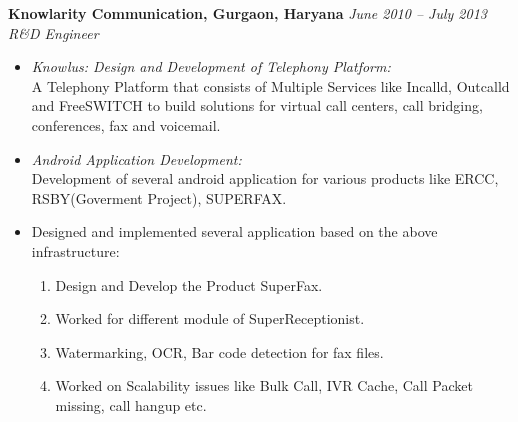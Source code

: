 \documentclass[margin,line]{resume}
\begin{document}
\begin{resume}
    \textbf{Knowlarity Communication, Gurgaon, Haryana}   \hfill \textsl{June 2010 -- July 2013} \vspace{0mm}\\\vspace{0mm}%
           \textsl{R\&D Engineer} 
    \begin{itemize}
     \item \textsl{Knowlus: Design and Development of Telephony Platform:} \\
       A Telephony Platform that consists of Multiple Services like Incalld, Outcalld and FreeSWITCH to build solutions for virtual call centers, call bridging, conferences, fax and voicemail.
      
     \item \textsl{Android Application Development:} \\
      Development of several android application for various products like ERCC, RSBY(Goverment Project), SUPERFAX.
     \item Designed and implemented several application based on the above infrastructure:
        \begin{enumerate}
         \item Design and Develop the Product SuperFax.
         \item Worked for different module of SuperReceptionist.
	     \item Watermarking, OCR, Bar code detection for fax files.
	     \item Worked on Scalability issues like Bulk Call, IVR Cache, Call Packet missing, call hangup etc.
        \end{enumerate}
    \end{itemize}


\end{resume}
\end{document}
